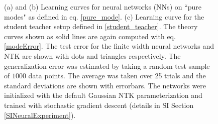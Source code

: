 \documentclass{article}
\begin{document}
\begin{figure}[t]


\caption{(a) and (b) Learning curves for neural networks (NNs) on ``pure modes" as defined in eq. \eqref{pure_mode}. (c) Learning curve for the student teacher setup defined in \eqref{student_teacher}. The theory curves shown as solid lines are again computed with eq. \eqref{modeError}. The test error for the finite width neural networks and NTK are shown with dots and triangles respectively. The generalization error was estimated by taking a random test sample of $1000$ data points. The average was taken over 25 trials and the standard deviations are shown with errorbars. The networks were initialized with the default Gaussian NTK parameterization \cite{jacot2018neural} and trained with stochastic gradient descent (details in SI Section \ref{SINeuralExperiment}).}
\label{fig:neural_net_expts}
\end{figure}
\end{document}
